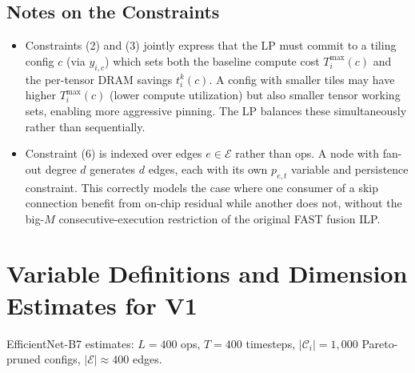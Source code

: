 \documentclass{article}
\begin{document}
\subsection{Notes on the Constraints}

\begin{itemize}
    \item Constraints (2) and (3) jointly express that the LP must commit to a tiling config
$c$ (via $y_{i,c}$) which sets both the baseline compute cost $T_i^{\max}(c)$ and
the per-tensor DRAM savings $t_i^k(c)$. A config with smaller tiles may have higher
$T_i^{\max}(c)$ (lower compute utilization) but also smaller tensor working sets,
enabling more aggressive pinning. The LP balances these simultaneously rather than
sequentially.
\item Constraint (6) is indexed over edges $e \in \mathcal{E}$ rather than ops.
A node with fan-out degree $d$ generates $d$ edges, each with its own $p_{e,t}$ variable
and persistence constraint. This correctly models the case where one consumer of a
skip connection benefit from on-chip residual while another does not, without the
big-$M$ consecutive-execution restriction of the original FAST fusion ILP.

\end{itemize}


\section{Variable Definitions and Dimension Estimates for V1}

EfficientNet-B7 estimates: $L = 400$ ops, $T = 400$ timesteps,
$|\mathcal{C}_i| = 1{,}000$ Pareto-pruned configs, $|\mathcal{E}| \approx 400$ edges.
\end{document}
